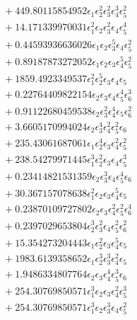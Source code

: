 \documentclass[10pt]{article}
\begin{document}
\begin{align*}
&{}  + 449.80115854952 \epsilon_{1} \epsilon_{2}^{2} \epsilon_{3}^{2} \epsilon_{4}^{3} \epsilon_{5}^{2} \\
&{}  + 14.171339970031 \epsilon_{1}^{2} \epsilon_{2} \epsilon_{3}^{2} \epsilon_{4} \epsilon_{5}^{4} \\
&{}  + 0.44593936636026 \epsilon_{1} \epsilon_{2} \epsilon_{3}^{5} \epsilon_{4} \epsilon_{5}^{2} \\
&{}  + 0.89187873272052 \epsilon_{1} \epsilon_{2} \epsilon_{3} \epsilon_{4}^{5} \epsilon_{5}^{2} \\
&{}  + 1859.4923349537 \epsilon_{1}^{2} \epsilon_{2}^{5} \epsilon_{3} \epsilon_{4} \epsilon_{5} \\
&{}  + 0.22764409822154 \epsilon_{2} \epsilon_{3} \epsilon_{4} \epsilon_{5}^{4} \epsilon_{6}^{3} \\
&{}  + 0.91122680459538 \epsilon_{2} \epsilon_{3}^{2} \epsilon_{4}^{4} \epsilon_{5} \epsilon_{6}^{2} \\
&{}  + 3.6605170994024 \epsilon_{2} \epsilon_{3}^{4} \epsilon_{4}^{2} \epsilon_{5}^{2} \epsilon_{6} \\
&{}  + 235.43061687061 \epsilon_{1} \epsilon_{2}^{4} \epsilon_{3} \epsilon_{4}^{2} \epsilon_{5}^{2} \\
&{}  + 238.54279971445 \epsilon_{1}^{3} \epsilon_{2}^{2} \epsilon_{3} \epsilon_{4} \epsilon_{5}^{3} \\
&{}  + 0.23414821531359 \epsilon_{2} \epsilon_{3}^{3} \epsilon_{4} \epsilon_{5}^{4} \epsilon_{6} \\
&{}  + 30.367157078638 \epsilon_{1}^{2} \epsilon_{2} \epsilon_{3} \epsilon_{4}^{5} \epsilon_{5} \\
&{}  + 0.23870109727802 \epsilon_{2} \epsilon_{3} \epsilon_{4}^{2} \epsilon_{5}^{2} \epsilon_{6}^{4} \\
&{}  + 0.2397029653804 \epsilon_{2}^{3} \epsilon_{3}^{2} \epsilon_{4} \epsilon_{5}^{2} \epsilon_{6}^{2} \\
&{}  + 15.354273204443 \epsilon_{1} \epsilon_{2}^{2} \epsilon_{3} \epsilon_{4}^{5} \epsilon_{5} \\
&{}  + 1983.6139358652 \epsilon_{1} \epsilon_{2}^{3} \epsilon_{3}^{3} \epsilon_{4}^{2} \epsilon_{5} \\
&{}  + 1.9486334807764 \epsilon_{2} \epsilon_{3} \epsilon_{4}^{4} \epsilon_{5}^{3} \epsilon_{6} \\
&{}  + 254.30769850571 \epsilon_{1}^{3} \epsilon_{2} \epsilon_{3} \epsilon_{4}^{2} \epsilon_{5}^{3} \\
&{}  + 254.30769850571 \epsilon_{1}^{3} \epsilon_{2} \epsilon_{3}^{3} \epsilon_{4} \epsilon_{5}^{2} \\

\end{align*}
\end{document}
